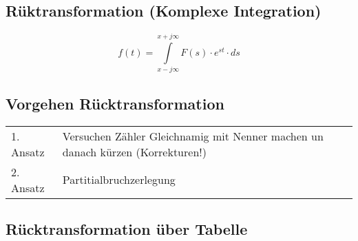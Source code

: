		\subsection{Rüktransformation (Komplexe Integration)}
			$$f(t)=\int\limits_{x-j\infty}^{x+j\infty}F(s) \cdot e^{st} \cdot ds$$
			
		\subsection{Vorgehen Rücktransformation}
		\begin{tabular}{ll}
  			1. Ansatz & Versuchen Zähler Gleichnamig mit Nenner machen un danach
  			kürzen (Korrekturen!) \\
  			2. Ansatz & Partitialbruchzerlegung
		\end{tabular}
			
		\newpage
		
		\subsection{Rücktransformation über Tabelle}
			\begin{center}
				
			\end{center}
			\vfill
		
				